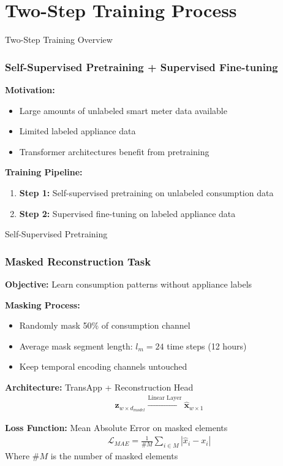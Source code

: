 \documentclass{beamer}
\begin{document}
\section{Two-Step Training Process}

\begin{frame}{Two-Step Training Overview}
\frametitle{Self-Supervised Pretraining + Supervised Fine-tuning}

\textbf{Motivation:}
\begin{itemize}
    \item Large amounts of unlabeled smart meter data available
    \item Limited labeled appliance data
    \item Transformer architectures benefit from pretraining
\end{itemize}

\vspace{0.5cm}

\textbf{Training Pipeline:}
\begin{enumerate}
    \item \textbf{Step 1:} Self-supervised pretraining on unlabeled consumption data
    \item \textbf{Step 2:} Supervised fine-tuning on labeled appliance data
\end{enumerate}

\vspace{0.5cm}


\end{frame}

\begin{frame}{Self-Supervised Pretraining}
\frametitle{Masked Reconstruction Task}

\textbf{Objective:} Learn consumption patterns without appliance labels

\textbf{Masking Process:}
\begin{itemize}
    \item Randomly mask 50\% of consumption channel
    \item Average mask segment length: $l_m = 24$ time steps (12 hours)
    \item Keep temporal encoding channels untouched
\end{itemize}

\vspace{0.3cm}

\textbf{Architecture:} TransApp + Reconstruction Head
\begin{align}
\mathbf{z}_{w \times d_{model}} \xrightarrow{\text{Linear Layer}} \hat{\mathbf{x}}_{w \times 1}
\end{align}

\textbf{Loss Function:} Mean Absolute Error on masked elements
\begin{align}
\mathcal{L}_{MAE} = \frac{1}{\#M} \sum_{i \in M} |\hat{x}_i - x_i|
\end{align}
Where $\#M$ is the number of masked elements

\end{frame}
\end{document}
